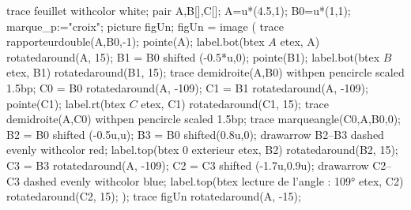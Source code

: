 \begin{changemargin}{0mm}{-20mm}
\begin{methode*2*2}
        \begin{Geometrie}[CoinHD={(8.5u,5u)}]
            trace feuillet withcolor white;
            pair A,B[],C[];
            A=u*(4.5,1);
            B0=u*(1,1);
            marque_p:="croix";
            picture figUn;
            figUn = image (
                trace rapporteurdouble(A,B0,-1);
                pointe(A);
                label.bot(btex $A$ etex, A) rotatedaround(A, 15);
                B1 = B0 shifted (-0.5*u,0);
                pointe(B1);
                label.bot(btex $B$ etex, B1)  rotatedaround(B1, 15);
                trace demidroite(A,B0) withpen pencircle scaled 1.5bp;
                C0 = B0 rotatedaround(A, -109);
                C1 = B1 rotatedaround(A, -109);
                pointe(C1);
                label.rt(btex $C$ etex, C1)  rotatedaround(C1, 15);
                trace demidroite(A,C0) withpen pencircle scaled 1.5bp;
                trace marqueangle(C0,A,B0,0);
                B2 = B0 shifted (-0.5u,u);
                B3 = B0 shifted(0.8u,0);
                drawarrow B2--B3 dashed evenly withcolor red;
                label.top(btex {\red $0$ exterieur} etex, B2) rotatedaround(B2, 15);
                C3 = B3 rotatedaround(A, -109);
                C2 = C3 shifted (-1.7u,0.9u);
                drawarrow C2--C3 dashed evenly withcolor blue;
                label.top(btex {\blue lecture de l'angle : \ang{109}} etex, C2) rotatedaround(C2, 15);
            );
            trace figUn rotatedaround(A, -15);
        \end{Geometrie}
    \end{methode*2*2}


\end{changemargin}
